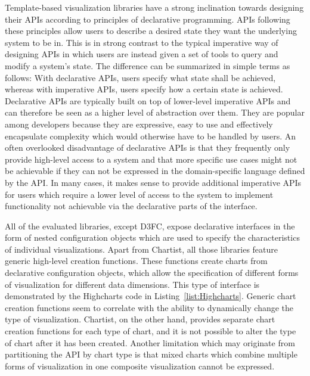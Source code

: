 Template-based visualization libraries have a strong inclination
towards designing their APIs according to principles of declarative
programming.  APIs following these principles allow users to describe
a desired state they want the underlying system to be in.  This is in
strong contrast to the typical imperative way of designing APIs in
which users are instead given a set of tools to query and modify a
system's state. The difference can be summarized in simple terms as
follows: With declarative APIs, users specify what state shall be
achieved, whereas with imperative APIs, users specify how a certain
state is achieved. Declarative APIs are typically built on top of
lower-level imperative APIs and can therefore be seen as a higher
level of abstraction over them. They are popular among developers
because they are expressive, easy to use and effectively encapsulate
complexity which would otherwise have to be handled by users. An often
overlooked disadvantage of declarative APIs is that they frequently
only provide high-level access to a system and that more specific use
cases might not be achievable if they can not be expressed in the
domain-specific language defined by the API. In many cases, it makes
sense to provide additional imperative APIs for users which require a
lower level of access to the system to implement functionality not
achievable via the declarative parts of the interface.

All of the evaluated libraries, except D3FC, expose declarative
interfaces in the form of nested configuration objects which are used
to specify the characteristics of individual visualizations. Apart
from Chartist, all those libraries feature generic high-level creation
functions. These functions create charts from declarative
configuration objects, which allow the specification of different
forms of visualization for different data dimensions. This type of
interface is demonstrated by the Highcharts code in
Listing~\ref{list:Highcharts}. Generic chart creation functions seem
to correlate with the ability to dynamically change the type of
visualization. Chartist, on the other hand, provides separate chart
creation functions for each type of chart, and it is not possible to
alter the type of chart after it has been created. Another limitation
which may originate from partitioning the API by chart type is that
mixed charts which combine multiple forms of visualization in one
composite visualization cannot be expressed.


\begin{samepage}
%
A basic column (vertical bar) chart defined using Highcharts' generic
chart creation API. A high-level, declarative configuration object is
passed to the creation function.
},
]{listings/highcharts.js}
\end{samepage}



